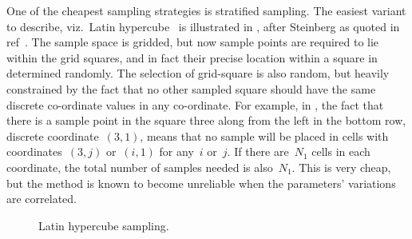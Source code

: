 One of the cheapest sampling strategies is stratified sampling.
The easiest variant to describe, viz.\ Latin hypercube~\cite{Mc79Comp}
is illustrated in ,
after Steinberg as quoted in ref~\cite[\S\,4]{kaloswhitlock}.
The sample space is gridded, but now sample
points are required to lie within the grid squares, and in fact their
precise location within a square in determined randomly.
The selection of grid-square is also random, but heavily constrained
by the fact that no other sampled square should have the same
discrete co-ordinate values in any co-ordinate. For example,
in , the fact that there is a sample point in the
square three along from the left in the bottom row, discrete
coordinate~$(3,1)$, means that no sample will be placed in
cells with coordinates~$(3,j)$ or~$(i,1)$ for any~$i$ or~$j$.
If there are~$N_1$ cells in each coordinate, the
total number of samples needed is also~$N_1$.
This is very cheap, but the method is known to
become unreliable when the parameters' variations are correlated.
\begin{figure}
\centerline{}
\caption{\label{fig:hcube}
 Latin hypercube sampling.}
\end{figure}
